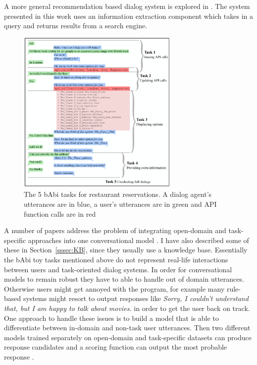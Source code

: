 \documentclass[12pt]{article}
\begin{document}
A more general recommendation based dialog system is explored in \cite{Yin:2017}. The system presented in this work uses an information extraction component which takes in a query and returns results from a search engine.

\begin{figure}[H]
	\label{fig:babi}
	\centering
	\includegraphics[width=0.7\textwidth]{pics/babi.png}
	\caption{The 5 bAbi tasks for restaurant reservations. A dialog agent's utterances are in blue, a user's utterances are in green and API function calls are in red \cite{Bordes:2016}}
\end{figure}
A number of papers address the problem of integrating open-domain and task-specific approaches into one conversational model \cite{Zhao:2017,Yu:2017,Akasaki:2017}. I have also described some of these in Section~\ref{sssec:KB}, since they usually use a knowledge base. Essentially the bAbi toy tasks mentioned above do not represent real-life interactions between users and task-oriented dialog systems. In order for conversational models to remain robust they have to able to handle out of domain utterances. Otherwise users might get annoyed with the program, for example many rule-based systems might resort to output responses like \textit{Sorry, I couldn't understand that, but I am happy to talk about movies.} in order to get the user back on track. One approach to handle these issues is to build a model that is able to differentiate between in-domain and non-task user utterances. Then two different models trained separately on open-domain and task-specific datasets can produce response candidates and a scoring function can output the most probable response \cite{Akasaki:2017}.
\end{document}
